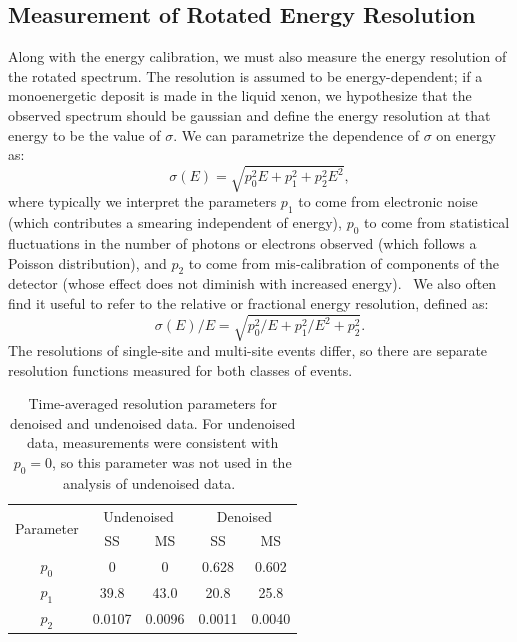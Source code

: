 \subsection{Measurement of Rotated Energy Resolution}\label{sec:RotatedEnergyResMeasurement}

Along with the energy calibration, we must also measure the energy resolution of the rotated spectrum.  The resolution is assumed to be energy-dependent; if a monoenergetic deposit is made in the liquid xenon, we hypothesize that the observed spectrum should be gaussian and define the energy resolution at that energy to be the value of $\sigma$.  We can parametrize the dependence of $\sigma$ on energy as:
\begin{equation}
\sigma(E) = \sqrt{p_0^2 E + p_1^2 + p_2^2 E^2},
\end{equation}
where typically we interpret the parameters $p_1$ to come from electronic noise (which contributes a smearing independent of energy), $p_0$ to come from statistical fluctuations in the number of photons or electrons observed (which follows a Poisson distribution), and $p_2$ to come from mis-calibration of components of the detector (whose effect does not diminish with increased energy).~\cite{knoll2000radiation}  We also often find it useful to refer to the relative or fractional energy resolution, defined as:
\begin{equation}
\sigma(E)/E = \sqrt{p_0^2/E + p_1^2/E^2 + p_2^2}.
\end{equation}
The resolutions of single-site and multi-site events differ, so there are separate resolution functions measured for both classes of events.

\begin{table}
\begin{center}
\begin{tabular}{|c|c|c|c|c|}
\hline \multirow{2}{*}{Parameter} & \multicolumn{2}{|c|}{Undenoised} & \multicolumn{2}{|c|}{Denoised}\\
\cline{2-5}& SS & MS & SS & MS \\
\hline $p_0$ & 0 & 0 & 0.628 & 0.602 \\
\hline $p_1$ & 39.8 & 43.0 & 20.8 & 25.8 \\
\hline $p_2$ & 0.0107 & 0.0096 & 0.0011 & 0.0040 \\ \hline
\end{tabular}
\end{center}
\caption{Time-averaged resolution parameters for denoised and undenoised data.  For undenoised data, measurements were consistent with $p_0 = 0$, so this parameter was not used in the analysis of undenoised data.~\cite{AverageEnergyResolutionDocument}}
\label{tab:ResolutionFunctions}
\end{table}

